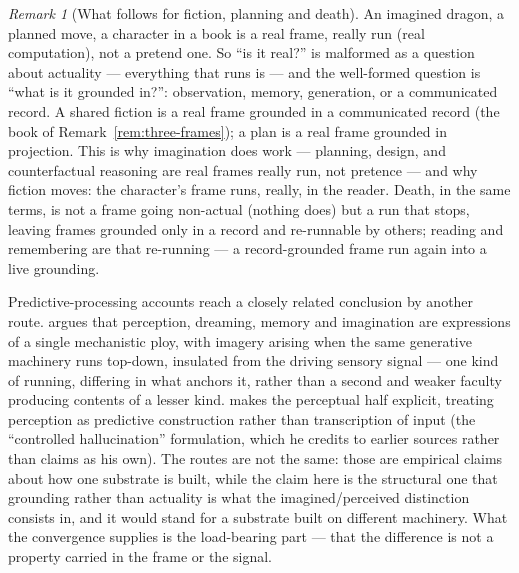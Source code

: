 \documentclass[11pt,a4paper]{article}
\theoremstyle{remark}\newtheorem{remark}[definition]{Remark}
\begin{document}
\begin{remark}[What follows for fiction, planning and death]\label{rem:imagination-consequences}
An imagined dragon, a planned move, a character in a book is a real frame, really run
(real computation), not a pretend one. So ``is it real?'' is malformed as a question
about actuality --- everything that runs is --- and the well-formed question is ``what
is it grounded in?'': observation, memory, generation, or a communicated record. A
shared fiction is a real frame grounded in a communicated record (the book of
Remark~\ref{rem:three-frames}); a plan is a real frame grounded in projection. This is
why imagination does work --- planning, design, and counterfactual reasoning are real
frames really run, not pretence --- and why fiction moves: the character's frame runs,
really, in the reader. Death, in the same terms, is not a frame going non-actual
(nothing does) but a run that stops, leaving frames grounded only in a record and
re-runnable by others; reading and remembering are that re-running --- a
record-grounded frame run again into a live grounding.
\end{remark}

Predictive-processing accounts reach a closely related conclusion by another route.
\citet{clark2016} argues that perception, dreaming, memory and imagination are
expressions of a single mechanistic ploy, with imagery arising when the same
generative machinery runs top-down, insulated from the driving sensory signal --- one
kind of running, differing in what anchors it, rather than a second and weaker faculty
producing contents of a lesser kind. \citet{seth2019} makes the perceptual half
explicit, treating perception as predictive construction rather than transcription of
input (the ``controlled hallucination'' formulation, which he credits to earlier
sources rather than claims as his own). The routes are not the same: those are
empirical claims about how one substrate is built, while the claim here is the
structural one that grounding rather than actuality is what the imagined/perceived
distinction consists in, and it would stand for a substrate built on different
machinery. What the convergence supplies is the load-bearing part --- that the
difference is not a property carried in the frame or the signal.
\end{document}
